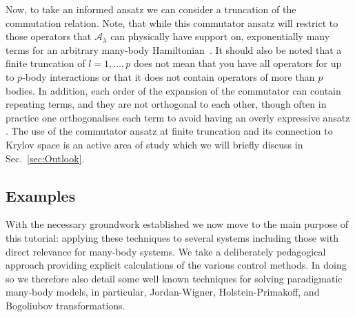 Now, to take an informed ansatz we can consider a truncation of the commutation relation. Note, that while this commutator ansatz will restrict to those operators that $\mathcal{A}_\lambda$ can physically have support on,  exponentially many terms for an arbitrary many-body Hamiltonian~\cite{lawrence2024numerical}. It should also be noted that a finite truncation of $l=1,\dots,p$ does not mean that you have all operators for up to $p$-body interactions or that it does not contain operators of more than $p$ bodies. In addition, each order of the expansion of the commutator can contain repeating terms, and they are not orthogonal to each other, though often in practice one orthogonalises each term to avoid having an overly expressive ansatz \cite{lawrence2024numerical,hatomura2021controlling,morawetz2024efficient}. The use of the commutator ansatz at finite truncation and its connection to Krylov space is an active area of study which we will briefly discuss in Sec.~\ref{sec:Outlook}.

\subsection{Examples}

With the necessary groundwork established we now move to the main purpose of this tutorial: applying these techniques to several systems including those with direct relevance for many-body systems. We take a deliberately pedagogical approach providing explicit calculations of the various control methods. In doing so we therefore also detail some well known techniques for solving paradigmatic many-body models, in particular, Jordan-Wigner, Holstein-Primakoff, and Bogoliubov transformations. 

